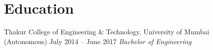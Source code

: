 \section{Education}
{Thakur College of Engineering \& Technology, University of Mumbai (Autonomous) \hspace{13mm} July 2014 -- June 2017}
    \hspace{0.05cm} { \textit{Bachelor of Engineering {\hspace{131mm} }}}